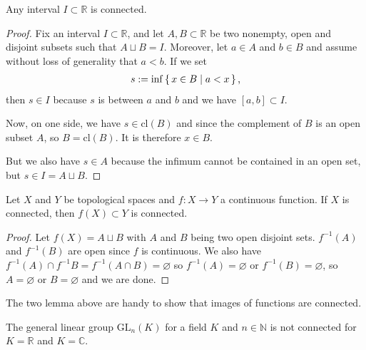 \begin{thmbox}
    \begin{lemma}
        Any {\color{mathif}interval} \(I \subset \mathbb{R}\) is {\color{maththen}connected}.
    \end{lemma}
\end{thmbox}
%
\begin{proof}
    Fix an interval \(I \subset \mathbb{R}\), and let \(A, B \subset \mathbb{R}\) be two nonempty, open and disjoint subsets such that \(A \sqcup B = I\). Moreover, let \(a \in A\) and \(b \in B\) and assume without loss of generality that \(a < b\). If we set
    \begin{align}
        s := \inf \left\{\, x \in B \mid a < x \,\right\} \text{,}
    \end{align}
    then \(s \in I\) because \(s\) is between \(a\) and \(b\) and we have \([a, b] \subset I\).

    Now, on one side, we have \(s \in \mathrm{cl}(B)\) and since the complement of \(B\) is an open subset \(A\), so \(B = \mathrm{cl}(B)\). It is therefore \(x \in B\).
    
    But we also have \(s \in A\) because the infimum cannot be contained in an open set, but \(s \in I = A \sqcup B\).
\end{proof}
%
\begin{thmbox}
    \begin{lemma}
        Let \(X\) and \(Y\) be {\color{mathif}topological spaces} and \(f: X \longrightarrow Y\) a {\color{mathif}continuous function}. If \(X\) is {\color{mathif}connected}, then \(f(X) \subset Y\) is {\color{maththen}connected}.
    \end{lemma}
\end{thmbox}
%
\begin{proof}
    Let \(f(X) = A \sqcup B\) with \(A\) and \(B\) being two open disjoint sets. \(f^{-1}(A)\) and \(f^{-1}(B)\) are open since \(f\) is continuous. We also have \(f^{-1}(A) \cap f^{-1}B = f^{-1}(A \cap B) = \varnothing\) so \(f^{-1}(A) = \varnothing\) or \(f^{-1}(B) = \varnothing\), so \(A = \varnothing\) or \(B = \varnothing\) and we are done.
\end{proof}
%
\begin{rembox}
    \begin{remark}
        The two lemma above are handy to show that images of functions are connected.
    \end{remark}
\end{rembox}
%
\begin{example}
    The general linear group \(\mathrm{GL}_n(K)\) for a field \(K\) and \(n \in \mathbb{N}\) is not connected for \(K = \mathbb{R}\) and \(K = \mathbb{C}\).
\end{example}
